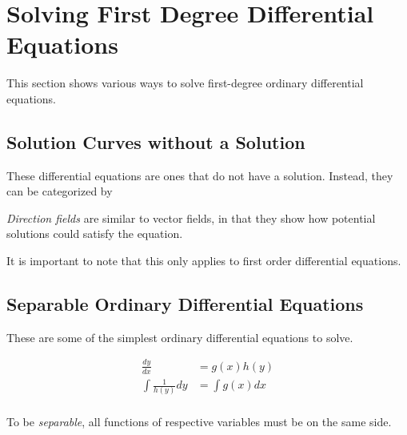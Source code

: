 \section{Solving First Degree Differential Equations} \label{sec:Solve First Degree Differential Equations}
This section shows various ways to solve first-degree ordinary differential equations.

\subsection{Solution Curves without a Solution} \label{subsec:Solution Curves without a Solution}
These differential equations are ones that do not have a solution.
Instead, they can be categorized by 
\begin{definition} \label{def:Direction Fields}
  \emph{Direction fields} are similar to vector fields, in that they show how potential solutions could satisfy the equation.

  \begin{remark}
    It is important to note that this only applies to first order differential equations.
  \end{remark}
\end{definition}

\subsection{Separable Ordinary Differential Equations} \label{subsec:Separable ODEs}
These are some of the simplest ordinary differential equations to solve.
\begin{definition} \label{def:Separable ODEs}
  \begin{equation} \label{eq:Separable ODEs}
    \begin{aligned}
      \frac{dy}{dx} &= g \left( x \right) h \left( y \right) \\
      \int \frac{1}{h \left( y \right)} dy &= \int g \left( x \right) dx \\
    \end{aligned}
  \end{equation}

  \begin{remark}
    To be \emph{separable}, all functions of respective variables must be on the same side.
  \end{remark}
\end{definition}

